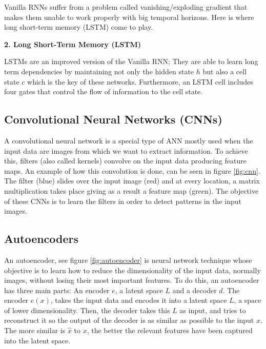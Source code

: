 Vanilla RNNs suffer from a problem called vanishing/exploding gradient that makes them unable to work properly with big temporal horizons. Here is where long short-term memory (LSTM) come to play.

\vspace{5mm} 
\textbf{2. Long Short-Term Memory (LSTM)}

LSTMs are an improved version of the Vanilla RNN; They are able to learn long term dependencies by maintaining not only the hidden state $h$ but also a cell state $c$ which is the key of these networks. Furthermore, an LSTM cell includes four gates that control the flow of information to the cell state.

\subsection{Convolutional Neural Networks (CNNs)}


A convolutional neural network is a special type of ANN mostly used when the input data are images from which we want to extract information. To achieve this, filters (also called kernels) convolve on the input data producing feature maps. An example of how this convolution is done, can be seen in figure \ref{fig:cnn}. The filter (blue) slides over the input image (red) and at every location, a matrix multiplication takes place giving as a result a feature map (green). The objective of these CNNs is to learn the filters in order to detect patterns in the input images.









\subsection{Autoencoders}

An autoencoder, see figure \ref{fig:autoencoder} is neural network technique whose objective is to learn how to reduce the dimensionality of the input data, normally images, without losing their most important features. To do this, an autoencoder has three main parts: An encoder $e$, a latent space $L$ and a decoder $d$. The encoder $e(x)$, takes the input data and encodes it into a latent space $L$, a space of lower dimensionality. Then, the decoder takes this $L$ as input, and tries to reconstruct it so the output of the decoder is as similar as possible to the input $x$. The more similar is $\hat{x}$ to $x$, the better the relevant features have been captured into the latent space.

